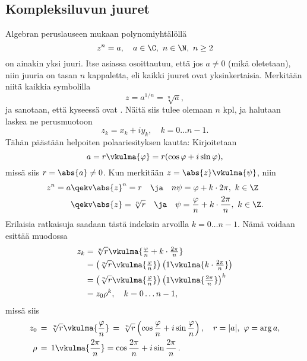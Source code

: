 \subsection{Kompleksiluvun juuret}

Algebran peruslauseen mukaan polynomiyhtälöllä
\begin{equation} \label{kompleksiluvun juuret}
z^n = a, \quad a \in \C,\ n \in \N,\ n \ge 2
\end{equation}
on ainakin yksi juuri. Itse asiassa osoittautuu, että jos $a \neq 0$ (mikä oletetaan), niin 
juuria on tasan $n$ kappaletta, eli kaikki juuret ovat yksinkertaisia. Merkitään niitä kaikkia 
symbolilla
\[
z=a^{1/n}=\sqrt[n]{a},
\]
ja sanotaan, että kyseessä ovat . Näitä siis tulee olemaan 
$n$ kpl, ja halutaan laskea ne perusmuotoon
\[
z_k = x_k + iy_k, \quad k=0 \ldots n-1.
\]
Tähän päästään helpoiten polaariesityksen kautta: Kirjoitetaan
\[
a= r \vkulma{\varphi} = r (\cos \varphi + i \sin \varphi),
\]
missä siis $r= \abs{a} \neq 0$. Kun merkitään $z=\abs{z}\vkulma{\psi}$, niin
\begin{align*}
z^n = a &\qekv \abs{z}^n = r \quad\ja\quad n\psi=\varphi+k\cdot 2\pi,\ k\in\Z \\
        &\qekv \abs{z}=\sqrt[n]{r} \quad\ja\quad 
               \psi=\frac{\varphi}{n}+k\cdot\frac{2\pi}{n},\ k\in\Z.
\end{align*}
Erilaisia ratkaisuja saadaan tästä indeksin arvoilla $k=0 \ldots n-1$. Nämä voidaan esittää
muodossa
\begin{align*}
z_k &= \sqrt[n]{r}\vkulma{\tfrac{\varphi}{n}+k\cdot\tfrac{2\pi}{n}} \\
    &= \left(\sqrt[n]{r}\vkulma{\tfrac{\varphi}{n}}\right)
       \left(1\vkulma{k\cdot\tfrac{2\pi}{n}}\right) \\
    &= \left(\sqrt[n]{r}\vkulma{\tfrac{\varphi}{n}}\right)
       \left(1\vkulma{\tfrac{2\pi}{n}}\right)^k \\
    &= z_0\rho^k, \quad k=0 \ldots n-1,
\end{align*}
missä siis
\begin{align*}
z_0  &\,=\,\sqrt[n]{r}\vkulma{\frac{\varphi}{n}} 
      \,=\,\sqrt[n]{r}\left(\cos\frac{\varphi}{n}+i\sin\frac{\varphi}{n}\right), \quad
                             r=|a|,\ \varphi=\arg a, \\
\rho &\,=\, 1\vkulma{\frac{2\pi}{n}} = \cos\frac{2\pi}{n}+i\sin\frac{2\pi}{n}\,.
\end{align*}
